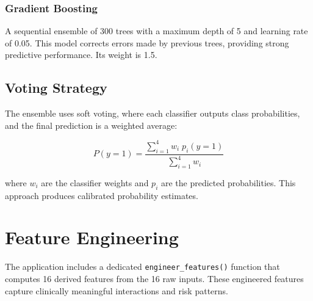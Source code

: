 \documentclass[11pt,a4paper]{article}
\begin{document}
\subsubsection{Gradient Boosting}
A sequential ensemble of 300 trees with a maximum depth of 5 and learning rate of 0.05. This model corrects errors made by previous trees, providing strong predictive performance. Its weight is 1.5.

\subsection{Voting Strategy}

The ensemble uses soft voting, where each classifier outputs class probabilities, and the final prediction is a weighted average:

\begin{equation*}
P(y = 1) = \frac{\displaystyle\sum_{i=1}^{4} w_i \; p_i(y = 1)}{\displaystyle\sum_{i=1}^{4} w_i}
\end{equation*}

where $w_i$ are the classifier weights and $p_i$ are the predicted probabilities. This approach produces calibrated probability estimates.

\section{Feature Engineering}
\label{sec:features}

The application includes a dedicated \texttt{engineer\_features()} function that computes 16 derived features from the 16 raw inputs. These engineered features capture clinically meaningful interactions and risk patterns.
\end{document}
